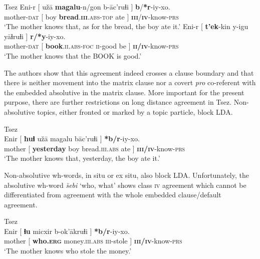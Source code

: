 \documentclass[output=paper
,modfonts
,nonflat]{langsci/langscibook}
\begin{document}
\begin{exe}
	\ex Tsez \citep[][610--611]{Polinsky_Potsdam2001}
	\xlist
	\ex \label{ex:tsez_overt_top}
		\gll Eni-r [ u\v{z}\=a \textbf{magalu}-n/gon b-\=ac’ruɬi ] \textbf{b}/\textbf{*r}-iy-xo.\\
			mother-\textsc{dat} [ boy \textbf{bread}.\textsc{\textbf{iii}.abs-top} ate ] \textsc{\textbf{iii}}/\textsc{\textbf{iv}}-know-\textsc{prs}\\
		\glt `The mother knows that, as for the bread, the boy ate it.' 
	\ex \label{ex:tsez_overt_foc}
		\gll Eni-r [ \textbf{t'ek}-kin y-igu y\=aɬruɬi ] \textbf{r/*y}-iy-xo.\\
			 mother-\textsc{dat} [ \textbf{book}.\textsc{ii.abs-foc}  \textsc{ii}-good be ] \textbf{\textsc{ii/iv}}-know-\textsc{prs}\\
	    \glt `The mother knows that the BOOK is good.'
	\endxlist
\end{exe}
The authors show that this agreement indeed crosses a clause boundary and that there is neither movement into the matrix clause nor a covert \textit{pro} co-referent with the embedded absolutive in the matrix clause. More important for the present purpose, there are further restrictions on long distance agreement in Tsez. Non-absolutive topics, either fronted or marked by a topic particle, block LDA.
\begin{exe}
	\ex Tsez \citep[][636]{Polinsky_Potsdam2001} \label{ex:tsez_nonabs_top}\\
		\gll Enir [ \textbf{ħuɬ} u\v{z}\=a magalu b\=ac’ruɬi ] \textbf{*b/r}-iy-xo.\\
		mother [ \textbf{yesterday} boy bread.\textsc{iii.abs} ate ] \textsc{\textbf{iii/iv}}-know-\textsc{prs}\\
		\glt `The mother knows that, yesterday, the boy ate it.'
\end{exe}
Non-absolutive wh-words, in situ or ex situ, also block LDA. Unfortunately, the absolutive wh-word \textit{\u{s}ebi} `who, what' shows class \textsc{iv} agreement which cannot be differentiated from agreement with the whole embedded clause/default agreement.
\begin{exe}
	\ex Tsez \citep[][634]{Polinsky_Potsdam2001} \label{ex:tsez_wh}\\
		\gll Enir [ \textbf{ɬu} micxir b-ok'\=akruɬi ] \textbf{*b/r}-iy-xo.\\
		 mother [ \textbf{who.\textsc{erg}} money.\textsc{iii.abs} \textsc{iii}-stole ]	\textsc{\textbf{iii/iv}}-know-\textsc{prs}\\
		\glt `The mother knows who stole the money.'
\end{exe}
\end{document}
